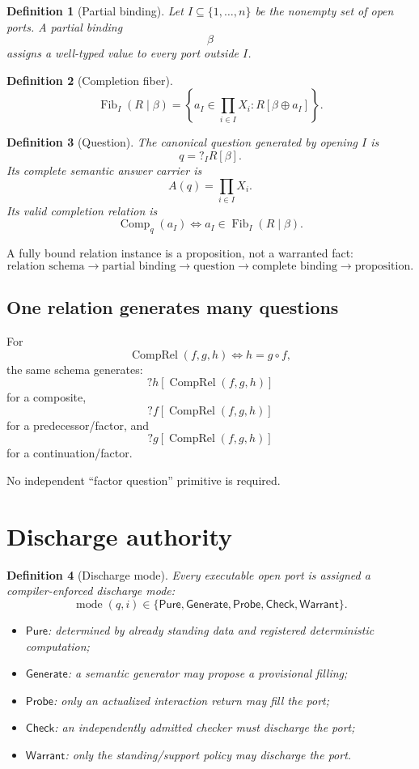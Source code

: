 \documentclass[11pt,oneside]{article}
\newtheorem{definition}{Definition}[section]
\newcommand{\Fib}{\operatorname{Fib}}
\newcommand{\Comp}{\operatorname{Comp}}
\begin{document}
\begin{definition}[Partial binding]
Let \(I\subseteq\{1,\ldots,n\}\) be the nonempty set of open ports.  A partial binding
\[
\beta
\]
assigns a well-typed value to every port outside \(I\).
\end{definition}

\begin{definition}[Completion fiber]
\[
\boxed{
\Fib_I(R\mid\beta)
=
\left\{
a_I\in\prod_{i\in I}X_i:
R[\beta\oplus a_I]
\right\}.
}
\]
\end{definition}

\begin{definition}[Question]
The canonical question generated by opening \(I\) is
\[
\boxed{
q=?_I R[\beta].
}
\]
Its complete semantic answer carrier is
\[
A(q)=\prod_{i\in I}X_i.
\]
Its valid completion relation is
\[
\Comp_q(a_I)\iff a_I\in\Fib_I(R\mid\beta).
\]
\end{definition}

A fully bound relation instance is a proposition, not a warranted fact:
\[
\boxed{
\text{relation schema}
\to
\text{partial binding}
\to
\text{question}
\to
\text{complete binding}
\to
\text{proposition}.
}
\]

\subsection{One relation generates many questions}

For
\[
\operatorname{CompRel}(f,g,h)\iff h=g\circ f,
\]
the same schema generates:
\[
?h[\operatorname{CompRel}(f,g,h)]
\]
for a composite,
\[
?f[\operatorname{CompRel}(f,g,h)]
\]
for a predecessor/factor, and
\[
?g[\operatorname{CompRel}(f,g,h)]
\]
for a continuation/factor.

No independent ``factor question'' primitive is required.

\section{Discharge authority}

\begin{definition}[Discharge mode]
Every executable open port is assigned a compiler-enforced discharge mode:
\[
\boxed{
\operatorname{mode}(q,i)
\in
\{
\mathsf{Pure},
\mathsf{Generate},
\mathsf{Probe},
\mathsf{Check},
\mathsf{Warrant}
\}.
}
\]

\begin{itemize}
\item \(\mathsf{Pure}\): determined by already standing data and registered deterministic computation;
\item \(\mathsf{Generate}\): a semantic generator may propose a provisional filling;
\item \(\mathsf{Probe}\): only an actualized interaction return may fill the port;
\item \(\mathsf{Check}\): an independently admitted checker must discharge the port;
\item \(\mathsf{Warrant}\): only the standing/support policy may discharge the port.
\end{itemize}
\end{definition}
\end{document}
